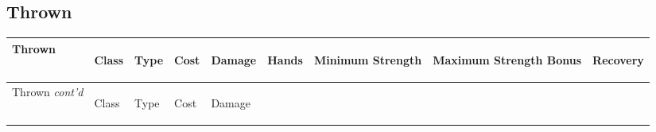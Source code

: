 \documentclass[twoside]{book}
\begin{document}
    

\subsection{Thrown}
    
\begin{longtable}{p{1.25in}llllp{2em}p{3em}p{3em}l} 
  Thrown
  &
  \begin{turn}{70}{Class}\end{turn}
          
  &
  \begin{turn}{70}{Type}\end{turn}
          
  &
  \begin{turn}{70}{Cost}\end{turn}
          
  &
  \begin{turn}{70}{Damage}\end{turn}
          
  &
  \begin{turn}{70}{Hands}\end{turn}
          
  &
  \begin{turn}{70}{Minimum Strength}\end{turn}
          
  &
  \begin{turn}{70}{Maximum Strength Bonus}\end{turn}
          
  &
  \begin{turn}{70}{Recovery}\end{turn}
          
  \\
  \hline
  \hline
  \endfirsthead
  Thrown \textit{cont'd}
        
  &
  \begin{turn}{70}{Class}\end{turn}
          
  &
  \begin{turn}{70}{Type}\end{turn}
          
  &
  \begin{turn}{70}{Cost}\end{turn}
          
  &
  \begin{turn}{70}{Damage}\end{turn}
          

\end{longtable}
\end{document}
